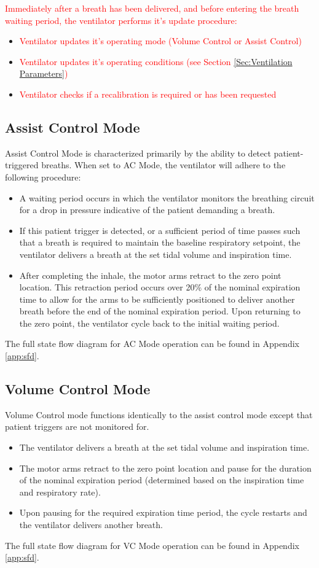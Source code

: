 \documentclass[]{article}
\begin{document}
\textcolor{red}{
Immediately after a breath has been delivered, and before entering the breath waiting period, the ventilator performs it's update procedure:}
\begin{itemize}
	\item \textcolor{red}{Ventilator updates it's operating mode (Volume Control or Assist Control)}
	\item \textcolor{red}{Ventilator updates it's operating conditions (see Section \ref{Sec:Ventilation Parameters})}
	\item \textcolor{red}{Ventilator checks if a recalibration is required or has been requested}
	
\end{itemize}


\subsection{Assist Control Mode}
\label{sect:acMode}
Assist Control Mode is characterized primarily by the ability to detect patient-triggered breaths.  When set to AC Mode, the ventilator will adhere to the following procedure:
\begin{itemize}
	\item A waiting period occurs in which the ventilator monitors the breathing circuit for a drop in pressure indicative of the patient demanding a breath.
	\item If this patient trigger is detected, or a sufficient period of time passes such that a breath is required to maintain the baseline respiratory setpoint, the ventilator delivers a breath at the set tidal volume and inspiration time.
	\item After completing the inhale, the motor arms retract to the zero point location.  This retraction period occurs over 20\% of the nominal expiration time to allow for the arms to be sufficiently positioned to deliver another breath before the end of the nominal expiration period.  Upon returning to the zero point, the ventilator cycle back to the initial waiting period. 
\end{itemize}
The full state flow diagram for AC Mode operation can be found in Appendix \ref{app:sfd}.


\subsection{Volume Control Mode}
\label{sect:vcMode}
Volume Control mode functions identically to the assist control mode except that patient triggers are not monitored for.
\begin{itemize}
	\item The ventilator delivers a breath at the set tidal volume and inspiration time.
	\item The motor arms retract to the zero point location and pause for the duration of the nominal expiration period (determined based on the inspiration time and respiratory rate).
	\item Upon pausing for the required expiration time period, the cycle restarts and the ventilator delivers another breath.
\end{itemize}
The full state flow diagram for VC Mode operation can be found in Appendix \ref{app:sfd}.
\end{document}

